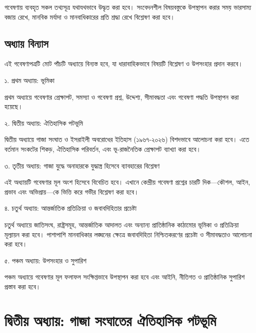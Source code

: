 গবেষণায় ব্যবহৃত সকল তথ্যসূত্র যথাযথভাবে উদ্ধৃত করা হবে। সংবেদনশীল বিষয়বস্তুকে উপস্থাপন করার সময় ভারসাম্য বজায় রেখে, মানবিক মর্যাদা ও মানবাধিকারের প্রতি শ্রদ্ধা রেখে বিশ্লেষণ করা হবে।

\subsection{\texorpdfstring{অধ্যায় বিন্যাস}{১.৮ অধ্যায় বিন্যাস}}\label{ux985ux9a7ux9afux9df-ux9acux9a8ux9afux9b8}

এই গবেষণাপত্রটি মোট পাঁচটি অধ্যায়ে বিন্যস্ত হবে, যা ধারাবাহিকভাবে বিষয়টি বিশ্লেষণ ও উপসংহার প্রদান করবে।

১. প্রথম অধ্যায়: ভূমিকা

প্রথম অধ্যায়ে গবেষণার প্রেক্ষাপট, সমস্যা ও গবেষণা প্রশ্ন, উদ্দেশ্য, সীমাবদ্ধতা এবং গবেষণা পদ্ধতি উপস্থাপন করা হয়েছে।

২. দ্বিতীয় অধ্যায়: ঐতিহাসিক পটভূমি

দ্বিতীয় অধ্যায়ে গাজা সংঘাত ও ইসরাইলী অবরোধের ইতিহাস (১৯৬৭-২০২৬) বিশদভাবে আলোচনা করা হবে। এতে বর্তমান সংকটের শিকড়, ঐতিহাসিক পরিবর্তন, এবং ভূ-রাজনৈতিক প্রেক্ষাপট ব্যাখ্যা করা হবে।

৩. তৃতীয় অধ্যায়: গাজা যুদ্ধে অনাহারকে যুদ্ধাস্ত্র হিসেবে ব্যাবহারের বিশ্লেষণ

এই অধ্যায়টি গবেষণার মূল অংশ হিসেবে বিবেচিত হবে। এখানে কেন্দ্রীয় গবেষণা প্রশ্নের চারটি দিক---কৌশল, আইন, প্রভাব এবং অভিপ্রায়---কে ভিত্তি করে গভীর বিশ্লেষণ করা হবে।

৪. চতুর্থ অধ্যায়: আন্তর্জাতিক প্রতিক্রিয়া ও জবাবদিহিতার প্রচেষ্টা

চতুর্থ অধ্যায়ে জাতিসংঘ, রাষ্ট্রসমূহ, আন্তর্জাতিক আদালত এবং অন্যান্য প্রাতিষ্ঠানিক কাঠামোর ভূমিকা ও প্রতিক্রিয়া মূল্যায়ন করা হবে। পাশাপাশি মানবাধিকার লঙ্ঘনের ক্ষেত্রে জবাবদিহিতা নিশ্চিতকরণের প্রচেষ্টা ও সীমাবদ্ধতাও আলোচনা করা হবে।

৫. পঞ্চম অধ্যায়: উপসংহার ও সুপারিশ

পঞ্চম অধ্যায়ে গবেষণার মূল ফলাফল সংক্ষিপ্তভাবে উপস্থাপন করা হবে এবং আইনি, নীতিগত ও প্রাতিষ্ঠানিক সুপারিশ প্রস্তাব করা হবে।



\section{\texorpdfstring{দ্বিতীয় অধ্যায়: গাজা সংঘাতের ঐতিহাসিক পটভূমি }{দ্বিতীয় অধ্যায়: গাজা সংঘাতের ঐতিহাসিক পটভূমি }}\label{ux9a6ux9acux9a4ux9df-ux985ux9a7ux9afux9df-ux997ux99c-ux9b8ux998ux9a4ux9b0-ux990ux9a4ux9b9ux9b8ux995-ux9aaux99fux9adux9ae}

